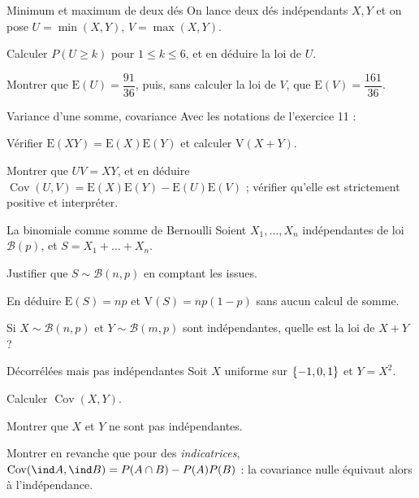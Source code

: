 \begin{exercice}[2]{Minimum et maximum de deux dés}
On lance deux dés indépendants $X,Y$ et on pose $U=\min(X,Y)$,
$V=\max(X,Y)$.
\begin{questions}
  \item Calculer $P(U\geqslant k)$ pour $1\leqslant k\leqslant6$, et en
    déduire la loi de $U$.
  \item Montrer que $\mathrm{E}(U)=\dfrac{91}{36}$, puis, sans calculer la
    loi de $V$, que $\mathrm{E}(V)=\dfrac{161}{36}$.
\end{questions}
\end{exercice}

\begin{exercice}[2]{Variance d'une somme, covariance}
Avec les notations de l'exercice 11 :
\begin{questions}
  \item Vérifier $\mathrm{E}(XY)=\mathrm{E}(X)\mathrm{E}(Y)$ et calculer
    $\mathrm{V}(X+Y)$.
  \item Montrer que $UV=XY$, et en déduire
    $\operatorname{Cov}(U,V)=\mathrm{E}(X)\mathrm{E}(Y)-\mathrm{E}(U)\mathrm{E}(V)$ ;
    vérifier qu'elle est strictement positive et interpréter.
\end{questions}
\end{exercice}

\begin{exercice}[2]{La binomiale comme somme de Bernoulli}
Soient $X_1,\dots,X_n$ indépendantes de loi $\mathcal{B}(p)$, et
$S=X_1+\dots+X_n$.
\begin{questions}
  \item Justifier que $S\sim\mathcal{B}(n,p)$ en comptant les issues.
  \item En déduire $\mathrm{E}(S)=np$ et $\mathrm{V}(S)=np(1-p)$ sans
    aucun calcul de somme.
  \item Si $X\sim\mathcal{B}(n,p)$ et $Y\sim\mathcal{B}(m,p)$ sont
    indépendantes, quelle est la loi de $X+Y$ ?
\end{questions}
\end{exercice}

\begin{exercice}[2]{Décorrélées mais pas indépendantes}
Soit $X$ uniforme sur $\left\{-1,0,1\right\}$ et $Y=X^{2}$.
\begin{questions}
  \item Calculer $\operatorname{Cov}(X,Y)$.
  \item Montrer que $X$ et $Y$ ne sont pas indépendantes.
  \item Montrer en revanche que pour des \emph{indicatrices},
    $\operatorname{Cov}(\ind A,\ind B)=P(A\cap B)-P(A)P(B)$ : la
    covariance nulle équivaut alors à l'indépendance.
\end{questions}
\end{exercice}

